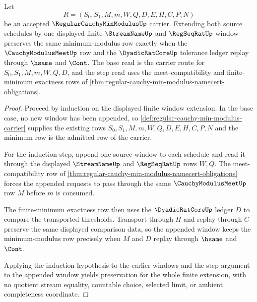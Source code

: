 \begin{theorem}
\label{thm:regular-cauchy-min-modulus-induction}
Let
$$
R=(S_0,S_1,M,m,W,Q,D,E,H,C,P,N)
$$
be an accepted $\RegularCauchyMinModulusUp$ carrier. Extending both source schedules by one displayed finite $\StreamNameUp$ and $\RegSeqRatUp$ window preserves the same minimum-modulus row exactly when the $\CauchyModulusMeetUp$ row and the $\DyadicRatCoreUp$ tolerance ledger replay through $\hsame$ and $\Cont$. The base read is the carrier route for $S_0,S_1,M,m,W,Q,D$, and the step read uses the meet-compatibility and finite-minimum exactness rows of \autoref{thm:regular-cauchy-min-modulus-namecert-obligations}.
\end{theorem}
\begin{proof}
Proceed by induction on the displayed finite window extension. In the base case, no new window has been appended, so \autoref{def:regular-cauchy-min-modulus-carrier} supplies the existing rows $S_0,S_1,M,m,W,Q,D,E,H,C,P,N$ and the minimum row is the admitted row of the carrier.

For the induction step, append one source window to each schedule and read it through the displayed $\StreamNameUp$ and $\RegSeqRatUp$ rows $W,Q$. The meet-compatibility row of \autoref{thm:regular-cauchy-min-modulus-namecert-obligations} forces the appended requests to pass through the same $\CauchyModulusMeetUp$ row $M$ before $m$ is consumed.

The finite-minimum exactness row then uses the $\DyadicRatCoreUp$ ledger $D$ to compare the transported thresholds. Transport through $H$ and replay through $C$ preserve the same displayed comparison data, so the appended window keeps the minimum-modulus row precisely when $M$ and $D$ replay through $\hsame$ and $\Cont$.

Applying the induction hypothesis to the earlier windows and the step argument to the appended window yields preservation for the whole finite extension, with no quotient stream equality, countable choice, selected limit, or ambient completeness coordinate.
\end{proof}

